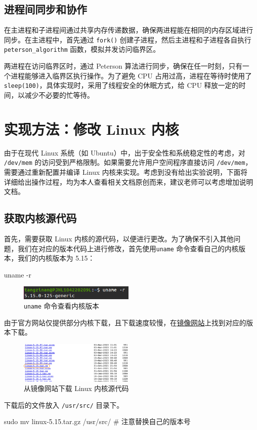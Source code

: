 \subsection{进程间同步和协作}

在主进程和子进程间通过共享内存传递数据，确保两进程能在相同的内存区域进行同步。在主进程中，首先通过 \texttt{fork()} 创建子进程，然后主进程和子进程各自执行 \texttt{peterson\_algorithm} 函数，模拟并发访问临界区。

两进程在访问临界区时，通过 Peterson 算法进行同步，确保在任一时刻，只有一个进程能够进入临界区执行操作。为了避免 CPU 占用过高，进程在等待时使用了 \texttt{sleep(100)}，具体实现时，采用了线程安全的休眠方式，给 CPU 释放一定的时间，以减少不必要的忙等待。

\section{实现方法：修改 Linux 内核}
由于在现代 Linux 系统（如 Ubuntu）中，出于安全性和系统稳定性的考虑，对 \texttt{/dev/mem} 的访问受到严格限制。如果需要允许用户空间程序直接访问 \texttt{/dev/mem}，需要通过重新配置并编译 Linux 内核来实现。考虑到没有给出实验说明，下面将详细给出操作过程，均为本人查看相关文档原创而来，建议老师可以考虑增加说明文档。

\subsection{获取内核源代码}

首先，需要获取 Linux 内核的源代码，以便进行更改。为了确保不引入其他问题，我们在对应的版本代码上进行修改，首先使用\texttt{uname} 命令查看自己的内核版本，我们的内核版本为 5.15：
\begin{bashcode}
  uname -r
\end{bashcode}
\begin{figure}[htbp]
    \centering
    \includegraphics[width=0.5\textwidth]{images/uname.png}
    \caption{\texttt{uname} 命令查看内核版本}
\end{figure}

由于官方网站仅提供部分内核下载，且下载速度较慢，在\href{https://mirrors.edge.kernel.org/pub/linux/kernel/}{镜像网站}上找到对应的版本下载。
\begin{figure}[htbp]
    \centering
    \includegraphics[width=0.5\textwidth]{images/download.png}
    \caption{从镜像网站下载 Linux 内核源代码}
\end{figure}
下载后的文件放入 \texttt{/usr/src/} 目录下。
\begin{bashcode}
    sudo mv linux-5.15.tar.gz /usr/src/ # 注意替换自己的版本号
\end{bashcode}

